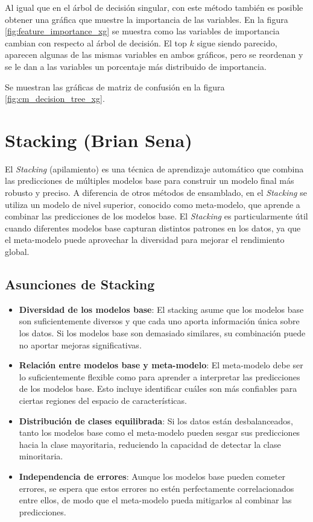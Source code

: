 \documentclass[12pt,letterpaper]{article}
\begin{document}
Al igual que en el árbol de decisión singular, con este método también es posible obtener una gráfica que muestre la importancia de las variables. En la figura \ref{fig:feature_importance_xg} se muestra como las variables de importancia cambian con respecto al árbol de decisión. El top $k$ sigue siendo parecido, aparecen algunas de las mismas variables en ambos gráficos, pero se reordenan y se le dan a las variables un porcentaje más distribuido de importancia.

Se muestran las gráficas de matriz de confusión en la figura \ref{fig:cm_decision_tree_xg}.

\section{Stacking (Brian Sena)}
El \textit{Stacking} (apilamiento) es una técnica de aprendizaje automático que combina las predicciones de múltiples modelos base para construir un modelo final más robusto y preciso. 
A diferencia de otros métodos de ensamblado, en el \textit{Stacking} se utiliza un modelo de nivel superior, conocido como meta-modelo, que aprende a combinar las predicciones de los modelos base.
El \textit{Stacking} es particularmente útil cuando diferentes modelos base capturan distintos patrones en los datos, ya que el meta-modelo puede aprovechar la diversidad para mejorar el rendimiento global. 
\subsection{Asunciones de Stacking}
\begin{itemize}
    \item \textbf{Diversidad de los modelos base}: El stacking asume que los modelos base son suficientemente diversos y que cada uno aporta información única sobre los datos. Si los modelos base son demasiado similares, su combinación puede no aportar mejoras significativas.
    \item \textbf{Relación entre modelos base y meta-modelo}: El meta-modelo debe ser lo suficientemente flexible como para aprender a interpretar las predicciones de los modelos base. Esto incluye identificar cuáles son más confiables para ciertas regiones del espacio de características.
    \item \textbf{Distribución de clases equilibrada}: Si los datos están desbalanceados, tanto los modelos base como el meta-modelo pueden sesgar sus predicciones hacia la clase mayoritaria, reduciendo la capacidad de detectar la clase minoritaria.
    \item \textbf{Independencia de errores}: Aunque los modelos base pueden cometer errores, se espera que estos errores no estén perfectamente correlacionados entre ellos, de modo que el meta-modelo pueda mitigarlos al combinar las predicciones.
\end{itemize}
\end{document}
